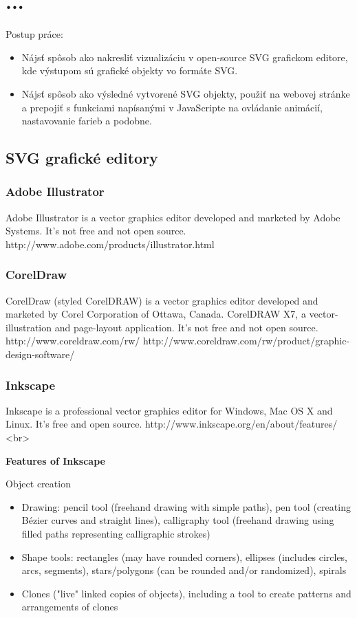 \chapter{...}


Postup práce: 
\begin{itemize}
\item Nájsť spôsob ako nakresliť vizualizáciu v open-source SVG grafickom editore, kde výstupom sú grafické objekty vo formáte SVG. 
\end{itemize}
\begin{itemize}
\item Nájsť spôsob ako výsledné vytvorené SVG objekty, použiť na webovej stránke a prepojiť s funkciami napísanými v JavaScripte na ovládanie animácií, nastavovanie farieb a podobne. 
\end{itemize}

\section{SVG grafické editory}
\subsection{Adobe Illustrator}
Adobe Illustrator is a vector graphics editor developed and marketed by Adobe Systems. 
 It's not free and not open source.
http://www.adobe.com/products/illustrator.html

\subsection{CorelDraw}
CorelDraw (styled CorelDRAW) is a vector graphics editor developed and marketed by Corel Corporation of Ottawa, Canada. CorelDRAW X7, a vector-illustration and page-layout application.  It's not free and not open source.
http://www.coreldraw.com/rw/
http://www.coreldraw.com/rw/product/graphic-design-software/

\subsection{Inkscape}
Inkscape is a professional vector graphics editor for Windows, Mac OS X and Linux. It's free and open source.
http://www.inkscape.org/en/about/features/
<br>

\textbf{Features of Inkscape}

 Object creation

\begin{itemize}
\item      Drawing: pencil tool (freehand drawing with simple paths), pen tool (creating Bézier curves and straight lines), calligraphy tool (freehand drawing using filled paths representing calligraphic strokes)
\item     Shape tools: rectangles (may have rounded corners), ellipses (includes circles, arcs, segments), stars/polygons (can be rounded and/or randomized), spirals
\item     Clones ("live" linked copies of objects), including a tool to create patterns and arrangements of clones
\end{itemize}


